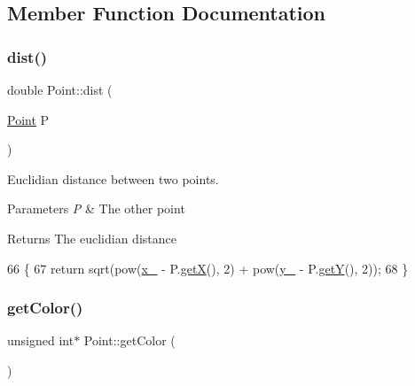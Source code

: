 \subsection{Member Function Documentation}
\mbox{\label{class_point_a31c7abcc57e3a3aefd0724d3c55c52a8}} 
\subsubsection{\texorpdfstring{dist()}{dist()}}
{\footnotesize\ttfamily double Point\+::dist (\begin{DoxyParamCaption}\item[{\mbox{\hyperlink{class_point}{Point}}}]{P }\end{DoxyParamCaption})}



Euclidian distance between two points. 


\begin{DoxyParams}{Parameters}
{\em P} & The other point \\
\hline
\end{DoxyParams}
\begin{DoxyReturn}{Returns}
The euclidian distance 
\end{DoxyReturn}

\begin{DoxyCode}
66                           \{
67     \textcolor{keywordflow}{return} sqrt(pow(\mbox{\hyperlink{class_point_acfe156c55546f7e551fb54c7ea08a6cb}{x\_}} - P.\mbox{\hyperlink{class_point_ac9d5859db121c7d1b89ca89266dca0a3}{getX}}(), 2) + pow(\mbox{\hyperlink{class_point_ae45effa2adb0036e4a770abb9b1160e6}{y\_}} - P.\mbox{\hyperlink{class_point_a86d10ff46e08462c45b15a8c7ef62d61}{getY}}(), 2));
68 \}
\end{DoxyCode}
\mbox{\label{class_point_a1aa902dd929328baec8c8f6970284ac2}} 
\subsubsection{\texorpdfstring{get\+Color()}{getColor()}}
{\footnotesize\ttfamily unsigned int$\ast$ Point\+::get\+Color (\begin{DoxyParamCaption}{ }\end{DoxyParamCaption})\hspace{0.3cm}{\ttfamily [inline]}}




